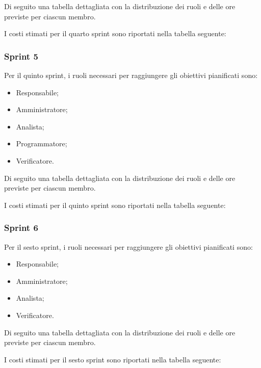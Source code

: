 \newpage
Di seguito una tabella dettagliata con la distribuzione dei ruoli e delle ore previste per ciascun membro.



I costi stimati per il quarto sprint sono riportati nella tabella seguente:



\subsubsection{Sprint 5}
Per il quinto sprint, i ruoli necessari per raggiungere gli obiettivi pianificati sono:
\begin{itemize}
    \item Responsabile;
    \item Amministratore;
    \item Analista;
    \item Programmatore;
    \item Verificatore.
\end{itemize}

\newpage
Di seguito una tabella dettagliata con la distribuzione dei ruoli e delle ore previste per ciascun membro.



I costi stimati per il quinto sprint sono riportati nella tabella seguente:



\subsubsection{Sprint 6}
Per il sesto sprint, i ruoli necessari per raggiungere gli obiettivi pianificati sono:
\begin{itemize}
    \item Responsabile;
    \item Amministratore;
    \item Analista;
    \item Verificatore.
\end{itemize}

\newpage
Di seguito una tabella dettagliata con la distribuzione dei ruoli e delle ore previste per ciascun membro.



I costi stimati per il sesto sprint sono riportati nella tabella seguente:

